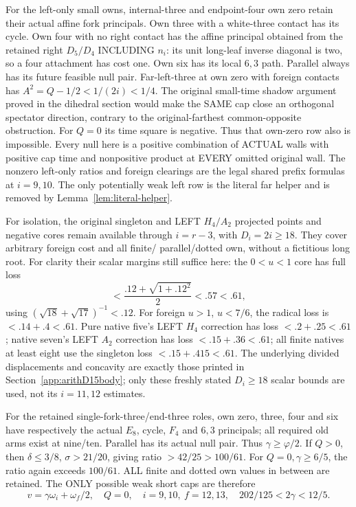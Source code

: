 \documentclass[11pt]{article}
\begin{document}
For the left-only small owns, internal-three and
endpoint-four own zero retain their actual affine
fork principals.
Own three with a white-three contact has its cycle.
Own four with no right contact has the affine
principal obtained from the retained right
\(D_5/D_4\) INCLUDING \(n_i\):
its unit long-leaf inverse diagonal is two,
so a four attachment has cost one.
Own six has its local \(6,3\) path.
Parallel always has its future feasible null pair.
Far-left-three at own zero with foreign contacts
has \(A^2=Q-1/2<1/(2i)<1/4\).
The original small-time shadow argument proved
in the dihedral section would make the SAME cap
close an orthogonal spectator direction, contrary
to the original-farthest common-opposite obstruction.
For \(Q=0\) its time square is negative.
Thus that own-zero row also is impossible.
Every null here is a positive combination of ACTUAL
walls with positive cap time and nonpositive product
at EVERY omitted original wall.
The nonzero left-only ratios and foreign clearings
are the legal shared prefix formulas at \(i=9,10\).
The only potentially weak left row is the literal
far helper and is removed by
Lemma~\ref{lem:literal-helper}.

For isolation, the original singleton and LEFT
\(H_4/A_2\) projected points and negative cores
remain available through \(i=r-3\), with \(D_i=2i\ge18\).
They cover arbitrary foreign cost and all finite/
parallel/dotted own, without a fictitious long root.
For clarity their scalar margins still suffice here:
the \(0<u<1\) core has full loss
\[
             <{\frac{.12+\sqrt{1+.12^2}}{2}}<.57<.61,
\]
using \((\sqrt{18}+\sqrt{17})^{-1}<.12\).
For foreign \(u>1\), \(u<7/6\), the radical
loss is \(<.14+.4<.61\).
Pure native five's LEFT \(H_4\) correction has
loss \(<.2+.25<.61\);
native seven's LEFT \(A_2\) correction has
loss \(<.15+.36<.61\);
all finite natives at least eight use the
singleton loss \(<.15+.415<.61\).
The underlying divided displacements and concavity
are exactly those printed in
Section~\ref{app:arithD15body};
only these freshly stated \(D_i\ge18\) scalar
bounds are used, not its \(i=11,12\) estimates.

For the retained single-fork-three/end-three roles,
own zero, three, four and six have respectively
the actual \(E_8\), cycle, \(F_4\) and \(6,3\)
principals; all required old arms exist at nine/ten.
Parallel has its actual null pair.
Thus \(\gamma\ge\varphi/2\).
If \(Q>0\), then \(\delta\le3/8\),
\(\sigma>21/20\), giving ratio \(>42/25>100/61\).
For \(Q=0,\gamma\ge6/5\), the ratio again exceeds
\(100/61\).
ALL finite and dotted own values in between
are retained.
The ONLY possible weak short caps are therefore
\[
 v=\gamma\omega_i+\omega_f/2,\quad Q=0,\quad
 i=9,10,\ f=12,13,\quad 202/125<2\gamma<12/5.
\]
\end{document}
